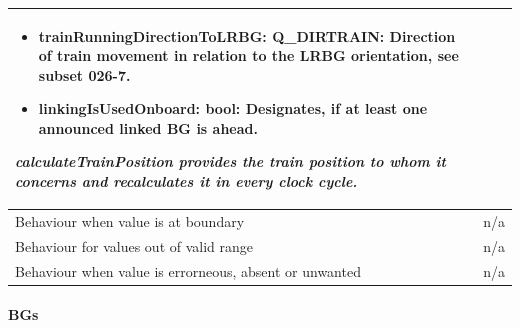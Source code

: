 \begin{longtable}{p{}p{}}
\begin{itemize}
\item trainRunningDirectionToLRBG: Q\_DIRTRAIN: Direction of train movement in relation to the LRBG orientation, see subset 026-7.
\item linkingIsUsedOnboard: bool: Designates, if at least one announced linked BG is ahead.
\end{itemize} 
\emph{calculateTrainPosition provides the train position to whom it concerns and recalculates it in every clock cycle.} \\
\midrule
Behaviour when value is at boundary	& n/a \\
\midrule
Behaviour for values out of valid range	& n/a \\
\midrule
Behaviour when value is errorneous, absent or unwanted & n/a \\
\bottomrule
\end{longtable}


\paragraph{BGs}

